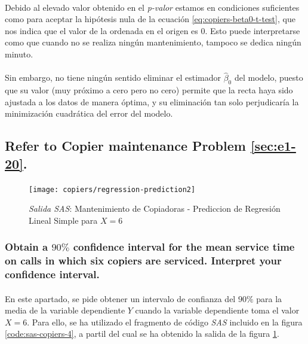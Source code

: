 \documentclass{article}
\begin{document}
        \paragraph{}
        Debido al elevado valor obtenido en el \emph{p-valor} estamos en condiciones suficientes como para aceptar la hipótesis nula de la ecuación \eqref{eq:copiers-beta0-t-test}, que nos indica que el valor de la ordenada en el origen es $0$. Esto puede interpretarse como que cuando no se realiza ningún mantenimiento, tampoco se dedica ningún minuto.

        \paragraph{}
        Sin embargo, no tiene ningún sentido eliminar el estimador $\widehat{\beta}_0$ del modelo, puesto que su valor (muy próximo a cero pero no cero) permite que la recta haya sido ajustada a los datos de manera óptima, y su eliminación tan solo perjudicaría la minimización cuadrática del error del modelo.

    \setcounter{subsection}{13}
    \subsection{Refer to \textbf{Copier maintenance} Problem \ref{sec:e1-20}.}

      \begin{figure}[H]
        \centering
        \texttt{[image: copiers/regression-prediction2]}
        \caption{\emph{Salida SAS}: Mantenimiento de Copiadoras - Prediccion de Regresión Lineal Simple para $X = 6$}
        \label{img:copiers-regression-prediction2}
      \end{figure}

      \subsubsection{Obtain a $90\%$ confidence interval for the mean service time on calls in which six copiers are serviced. Interpret your confidence interval.}
      \label{sec:copiers-2.14a}

        \paragraph{}
        En este apartado, se pide obtener un intervalo de confianza del $90\%$ para la media de la variable dependiente $Y$ cuando la variable dependiente toma el valor $X=6$. Para ello, se ha utilizado el fragmento de código \emph{SAS} incluido en la figura \ref{code:sas-copiers-4}, a partil del cual se ha obtenido la salida de la figura \ref{img:copiers-regression-prediction2}.
\end{document}
